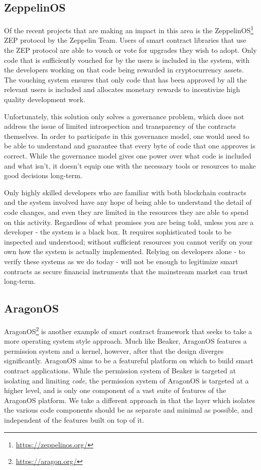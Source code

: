 \documentclass[english,a4paper]{article}
\begin{document}
\subsection{ZeppelinOS}
Of the recent projects that are making an impact in this area is the
ZeppelinOS\footnote{\url{https://zeppelinos.org/}} ZEP protocol by the Zeppelin Team.
Users of smart contract
libraries that use the ZEP protocol are able to vouch or vote for
upgrades they wish to adopt. Only code that is sufficiently vouched for
by the users is included in the system, with the developers working on
that code being rewarded in cryptocurrency assets. The vouching system
ensures that only code that has been approved by all the relevant users
is included and allocates monetary rewards to incentivize high quality
development work.

Unfortunately, this solution only solves a governance problem, which
does not address the issue of limited introspection and transparency of
the contracts themselves. In order to participate in this governance
model, one would need to be able to understand and guarantee that every
byte of code that one approves is correct. While the governance model
gives one power over what code is included and what isn't, it doesn't
equip one with the necessary tools or resources to make good decisions
long-term.

Only highly skilled developers who are familiar with both blockchain
contracts and the system involved have any hope of being able to
understand the detail of code changes, and even they are limited in the
resources they are able to spend on this activity. Regardless of what
promises you are being told, unless you are a developer - the system is
a black box. It requires sophisticated tools to be inspected and
understood; without sufficient resources you cannot verify on your own
how the system is actually implemented. Relying on developers alone - to
verify these systems as we do today - will not be enough to legitimize
smart contracts as secure financial instruments that the mainstream
market can trust long-term.

\subsection{AragonOS}
AragonOS\footnote{\url{https://aragon.org/}} is another example of smart contract
framework that seeks to take a more operating system style approach. Much like
Beaker, AragonOS features a permission system and a kernel, however, after that
the design diverges significantly. AragonOS aims to be a featureful platform on
which to build smart contract applications. While the permission system of
Beaker is targeted at isolating and limiting \emph{code}, the permission system
of AragonOS is targeted at a higher level, and is only one component of a vast
suite of features of the AragonOS platform. We take a different approach in that
the layer which isolates the various code components should be as separate and
minimal as possible, and independent of the features built on top of it.
\end{document}
